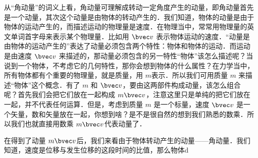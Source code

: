 
从“角动量”的词义上看，角动量可理解成转动一定角度产生的动量，即角动量首先是一个动量，其次这个动量是由物体的转动产生的．我们知道，物体的动量是由于物体的运动产生的，而描述运动的物理量是速度．在物理当中，常常用物理量的英文单词首字母来表示某个物理量．比如用 $\bvec v$ 表示物体运动的速度．“动量是由物体的运动产生的”表达了动量必须包含两个特性：物体和物体的运动．而运动是由速度 $\bvec v$ 来描述的，那动量必须包含的另一特性“物体”该怎么描述呢？当说到一个物体，不考虑它的几何特性，那你会想到物体的什么属性？在力学当中，所有物体都有个重要的物理量，就是质量，用 $m$表示．所以我们可用质量 $m$ 来描述“物体”这个概念．有了 $m$ 和 $\bvec v$，要由这两部件构成动量，该怎么组合呢？首先我们会把它们放在一起构成 $m\bvec v$，注意这里只是单纯的把它们放在一起，并不代表任何运算．但是，考虑到质量 $m$ 是一个标量，速度 $\bvec v$ 是一个矢量，数和矢量放在一起，你想到啥？是不是很自然的想到我们熟悉的数乘．所以我们也就直接用数乘 $m\bvec v$代表动量了．

在得到了动量 $m\bvec v$后，我们来看由于物体转动产生的动量——角动量．我们知道，速度是位移与发生位移的这段时间的比值，那么物体d